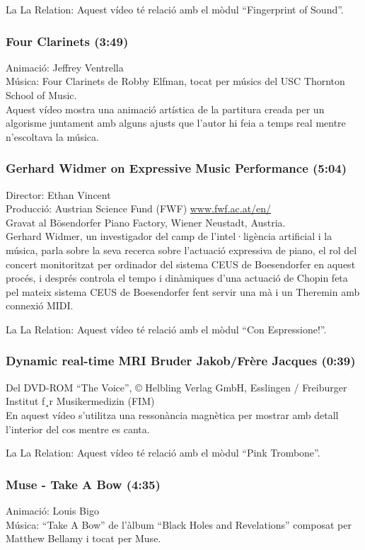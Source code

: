 La La Relation: Aquest vídeo té relació amb el mòdul ``Fingerprint of Sound''.

\subsubsection*{Four Clarinets (3:49)}
Animació: Jeffrey Ventrella \\
Música: Four Clarinets de Robby Elfman, tocat per músics del USC Thornton School of Music. \\

Aquest vídeo mostra una animació artística de la partitura creada per un algorisme juntament amb alguns ajusts que l'autor hi feia a temps real mentre n'escoltava la música.  

\subsubsection*{Gerhard Widmer on Expressive Music Performance (5:04)}
Director: Ethan Vincent \\
Producció: Austrian Science Fund (FWF) \url{www.fwf.ac.at/en/} \\
Gravat al Bösendorfer Piano Factory, Wiener Neustadt, Austria. \\

Gerhard Widmer, un investigador del camp de l'intel·ligència artificial i la música, parla sobre la seva recerca sobre l'actuació expressiva de piano, el rol del concert monitoritzat per ordinador del sistema CEUS de Boesendorfer en aquest procés, i després controla el tempo i dinàmiques d'una actuació de Chopin feta pel mateix sistema CEUS de Boesendorfer fent servir una mà i un Theremin amb connexió MIDI.

La La Relation: Aquest vídeo té relació amb el mòdul ``Con Espressione!''.

\subsubsection*{Dynamic real-time MRI Bruder Jakob/Frère Jacques (0:39)}
Del DVD-ROM ``The Voice'', © Helbling Verlag GmbH, Esslingen / Freiburger Institut f¸r Musikermedizin (FIM)\\

En aquest vídeo s'utilitza una ressonància magnètica per mostrar amb detall l'interior del cos mentre es canta.

La La Relation: Aquest vídeo té relació amb el mòdul ``Pink Trombone''.

\subsubsection*{Muse - Take A Bow (4:35)}
Animació: Louis Bigo \\
Música: ``Take A Bow'' de l'àlbum ``Black Holes and Revelations'' composat per Matthew Bellamy i tocat per Muse. \\

